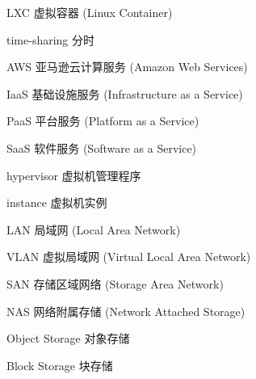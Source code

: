 \begin{denotation}[3cm]
\item[LXC] 虚拟容器 (Linux Container)
\item[time-sharing] 分时
\item[AWS] 亚马逊云计算服务 (Amazon Web Services)
\item[IaaS] 基础设施服务 (Infrastructure as a Service)
\item[PaaS] 平台服务 (Platform as a Service)
\item[SaaS] 软件服务 (Software as a Service)
\item[hypervisor] 虚拟机管理程序
\item[instance] 虚拟机实例
\item[LAN] 局域网 (Local Area Network)
\item[VLAN] 虚拟局域网 (Virtual Local Area Network)
\item[SAN] 存储区域网络 (Storage Area Network)
\item[NAS] 网络附属存储 (Network Attached Storage)
\item[Object Storage] 对象存储
\item[Block Storage] 块存储
\end{denotation}
